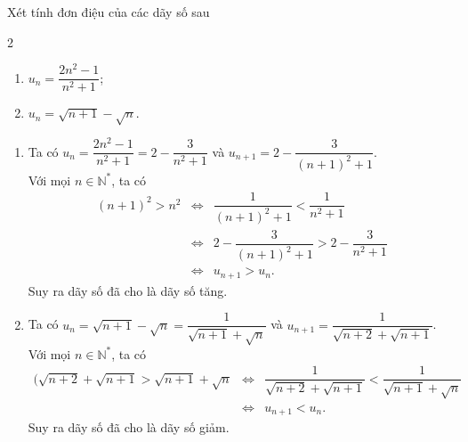 \begin{bt}%
	Xét tính đơn điệu của các dãy số sau
	\begin{multicols}{2}
		\begin{enumerate}
			\item $u_n=\dfrac{2n^2-1}{n^2+1}$;
			\item $u_n=\sqrt{n+1}-\sqrt{n}$.
		\end{enumerate}
	\end{multicols}
	\loigiai 
	{
		\begin{enumerate}
			\item Ta có $u_n=\dfrac{2n^2-1}{n^2+1}=2-\dfrac{3}{n^2+1}$ và $u_{n+1}=2-\dfrac{3}{(n+1)^2+1}$.\\
			Với mọi $n\in \mathbb{N}^*$, ta có
			\allowdisplaybreaks
			\begin{eqnarray*}
				(n+1)^2>n^2&\Leftrightarrow&\dfrac{1}{(n+1)^2+1}<\dfrac{1}{n^2+1}\\
				&\Leftrightarrow&2-\dfrac{3}{(n+1)^2+1}>2-\dfrac{3}{n^2+1}\\
				&\Leftrightarrow& u_{n+1}>u_n.
			\end{eqnarray*}
			Suy ra dãy số đã cho là dãy số tăng.
			\item Ta có $u_n=\sqrt{n+1}-\sqrt{n}=\dfrac{1}{\sqrt{n+1}+\sqrt{n}}$ và $u_{n+1}=\dfrac{1}{\sqrt{n+2}+\sqrt{n+1}}$.\\
			Với mọi $n\in \mathbb{N}^*$, ta có
			\allowdisplaybreaks
			\begin{eqnarray*}
				(\sqrt{n+2}+\sqrt{n+1}>\sqrt{n+1}+\sqrt{n}&\Leftrightarrow&\dfrac{1}{\sqrt{n+2}+\sqrt{n+1}}<\dfrac{1}{\sqrt{n+1}+\sqrt{n}}\\
				&\Leftrightarrow& u_{n+1}<u_n.
			\end{eqnarray*}
			Suy ra dãy số đã cho là dãy số giảm.
		\end{enumerate}
	}
\end{bt}

